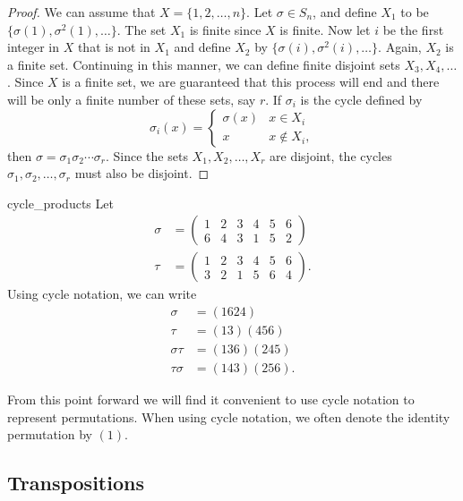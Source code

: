 \begin{proof}
We can assume that $X = \{ 1, 2, \ldots, n \}$. Let $\sigma \in S_n$,
and define $X_1$ to be $\{ \sigma(1), \sigma^2(1), \ldots \}$. The set
$X_1$ is finite since $X$ is finite. Now let $i$ be the first integer
in $X$ that is not in $X_1$ and define $X_2$ by $\{ \sigma(i),
\sigma^2(i), \ldots \}$. Again, $X_2$ is a finite set.  Continuing in
this manner, we can define finite disjoint sets $X_3, X_4, \ldots$.
Since $X$ is a finite set, we are guaranteed that this process will
end and there will be only a finite number of these sets, say $r$. If
$\sigma_i$ is the cycle defined by 
\[
\sigma_i( x )
= \left\{
\begin{array}{ll}
\sigma( x ) & x \in X_i \\
x & x \notin X_i,
\end{array}
\right.
\]
then $\sigma = \sigma_1 \sigma_2 \cdots \sigma_r$. Since the sets
$X_1, X_2, \ldots, X_r$ are disjoint, the cycles $\sigma_1, \sigma_2,
\ldots, \sigma_r$ must also be disjoint.
\end{proof}
 
\begin{example}{cycle_products}
Let
\begin{align*}
\sigma & =
\begin{pmatrix}
1 & 2 & 3 & 4 & 5 & 6 \\
6 & 4 & 3 & 1 & 5 & 2
\end{pmatrix} \\
\tau & =
\begin{pmatrix}
1 & 2 & 3 & 4 & 5 & 6 \\
3 & 2 & 1 & 5 & 6 & 4
\end{pmatrix}.
\end{align*}
Using cycle notation, we can write
\begin{align*}
\sigma & = (1624) \\
\tau & = (13)(456) \\
\sigma \tau & =  (1 3 6) ( 2 4 5) \\
\tau \sigma  & = (1 4 3 )(2 5 6). 
\end{align*}
\end{example}
 
From this point forward we will find it convenient to use cycle
notation to represent permutations. 
When using cycle notation, we often denote the identity permutation
by $(1)$.
 
 
\subsection*{Transpositions}

